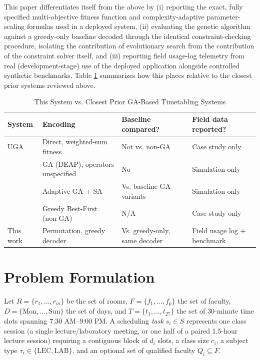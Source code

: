 \documentclass[conference]{IEEEtran}
\begin{document}
This paper differentiates itself from the above by (i) reporting the exact, fully specified multi-objective fitness function and complexity-adaptive parameter-scaling formulas used in a deployed system, (ii) evaluating the genetic algorithm against a greedy-only baseline decoded through the identical constraint-checking procedure, isolating the contribution of evolutionary search from the contribution of the constraint solver itself, and (iii) reporting field usage-log telemetry from real (development-stage) use of the deployed application alongside controlled synthetic benchmarks. Table \ref{tab:related} summarizes how this places relative to the closest prior systems reviewed above.

\begin{table}[t]
\caption{This System vs. Closest Prior GA-Based Timetabling Systems}
\label{tab:related}
\centering
\footnotesize
\begin{tabular}{p{1.15cm}p{1.55cm}p{1.5cm}p{2.5cm}}
\toprule
System & Encoding & Baseline compared? & Field data reported? \\
\midrule
UGA \cite{abdelhalim2016} & Direct, weighted-sum fitness & Not vs. non-GA & Case study only \\
\cite{subang2024} & GA (DEAP), operators unspecified & No & Simulation only \\
\cite{yan2025} & Adaptive GA + SA & Vs. baseline GA variants & Simulation only \\
\cite{ginting2022} & Greedy Best-First (non-GA) & N/A & Case study only \\
This work & Permutation, greedy decoder & Vs. greedy-only, same decoder & Field usage log + benchmark \\
\bottomrule
\end{tabular}
\end{table}

\section{Problem Formulation}

Let $R = \{r_1, \dots, r_m\}$ be the set of rooms, $F = \{f_1, \dots, f_p\}$ the set of faculty, $D = \{\text{Mon}, \dots, \text{Sun}\}$ the set of days, and $T = \{t_1, \dots, t_{27}\}$ the set of 30-minute time slots spanning 7:30 AM--9:00 PM. A scheduling \emph{task} $s_i \in S$ represents one class session (a single lecture/laboratory meeting, or one half of a paired 1.5-hour lecture session) requiring a contiguous block of $d_i$ slots, a class size $c_i$, a subject type $\tau_i \in \{\text{LEC}, \text{LAB}\}$, and an optional set of qualified faculty $Q_i \subseteq F$.
\end{document}
